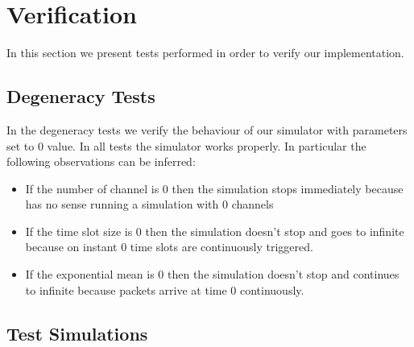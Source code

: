 \section{Verification}
In this section we present tests performed in order to verify our implementation.

\subsection{Degeneracy Tests}
In the degeneracy tests we verify the behaviour of our simulator with parameters set to 0 value. In all tests the simulator works properly. In particular the following observations can be inferred:
\begin{itemize}
	\item If the number of channel is 0 then the simulation stops immediately because has no sense running a simulation with 0 channels
	\item If the time slot size is 0 then the simulation doesn't stop and goes to infinite because on instant 0  time slots are continuously triggered.
	\item If the exponential mean is 0 then the simulation doesn't stop and continues to infinite because packets arrive at time 0 continuously.
\end{itemize}

\subsection{Test Simulations}
